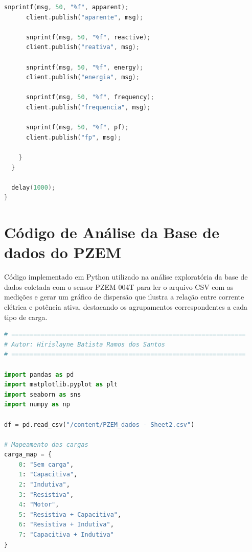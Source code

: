 \begin{apendicesenv}
\begin{lstlisting}[language=C++, caption={Integração entre PZEM e MQTT.}, label=cod_integracao_PZEM_MQTT]
      snprintf(msg, 50, "%f", apparent);
      client.publish("aparente", msg);
      
      snprintf(msg, 50, "%f", reactive);
      client.publish("reativa", msg);
      
      snprintf(msg, 50, "%f", energy);
      client.publish("energia", msg);
      
      snprintf(msg, 50, "%f", frequency);
      client.publish("frequencia", msg);
      
      snprintf(msg, 50, "%f", pf);
      client.publish("fp", msg);
      
    }
  }
  
  delay(1000);
}

\end{lstlisting}



\chapter{Código de Análise da Base de dados do PZEM}
\label{apendice_análise_PZEM}

Código implementado em Python utilizado na análise exploratória da base de dados coletada com o sensor PZEM-004T para ler o arquivo CSV com as medições e gerar um gráfico de dispersão que ilustra a relação entre corrente elétrica e potência ativa, destacando os agrupamentos correspondentes a cada tipo de carga.

\begin{lstlisting}[language=python, caption={Análise exploratória da base de dados do PZEM-004T.}, label=cod_analise_base_dados_pzem]
# ================================================================
# Autor: Hirislayne Batista Ramos dos Santos
# ================================================================

import pandas as pd
import matplotlib.pyplot as plt
import seaborn as sns
import numpy as np

df = pd.read_csv("/content/PZEM_dados - Sheet2.csv")

# Mapeamento das cargas
carga_map = {
    0: "Sem carga",
    1: "Capacitiva",
    2: "Indutiva",
    3: "Resistiva",
    4: "Motor",
    5: "Resistiva + Capacitiva",
    6: "Resistiva + Indutiva",
    7: "Capacitiva + Indutiva"
}


\end{lstlisting}
\end{apendicesenv}
